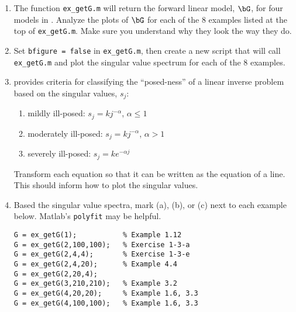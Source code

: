 \documentclass[11pt,titlepage,fleqn]{article}
\begin{document}
\begin{enumerate}
\item The function \verb+ex_getG.m+ will return the forward linear model, $\bG$, for four models in \citet{AsterE2}. Analyze the plots of $\bG$ for each of the 8 examples listed at the top of \verb+ex_getG.m+. Make sure you understand why they look the way they do.

\item Set \verb+bfigure = false+ in \verb+ex_getG.m+, then create a new script that will call \verb+ex_getG.m+ and plot the singular value spectrum for each of the 8 examples.

\item \citet[][p.~74]{AsterE2} provides criteria for classifying the ``posed-ness'' of a linear inverse problem based on the singular values, $s_j$:
%
\begin{enumerate}
\renewcommand{\theenumi}{\Alph{enumi}}
\item mildly ill-posed: $s_j = k j^{-\alpha}$, $\alpha \le 1$
\item moderately ill-posed: $s_j = k j^{-\alpha}$, $\alpha > 1$
\item severely ill-posed: $s_j = k e^{-\alpha j}$
\end{enumerate}
%
Transform each equation so that it can be written as the equation of a line. This should inform how to plot the singular values.

\item Based the singular value spectra, mark (a), (b), or (c) next to each example below. Matlab's \verb+polyfit+ may be helpful. 
%
\begin{spacing}{1.5}
\begin{verbatim}
G = ex_getG(1);           % Example 1.12
G = ex_getG(2,100,100);   % Exercise 1-3-a
G = ex_getG(2,4,4);       % Exercise 1-3-e
G = ex_getG(2,4,20);      % Example 4.4
G = ex_getG(2,20,4);
G = ex_getG(3,210,210);   % Example 3.2
G = ex_getG(4,20,20);     % Example 1.6, 3.3
G = ex_getG(4,100,100);   % Example 1.6, 3.3
\end{verbatim}
\end{spacing}
%
\end{enumerate}




\end{document}
